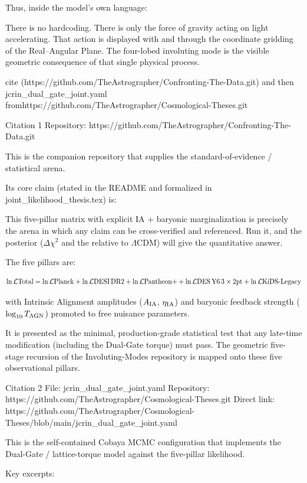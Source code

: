 Thus, inside the model’s own language:

There is no hardcoding.  
There is only the force of gravity acting on light accelerating.  
That action is displayed with and through the coordinate gridding of the Real–Angular Plane.  
The four-lobed involuting mode is the visible geometric consequence of that single physical process.

cite (https://github.com/TheAstrographer/Confronting-The-Data.git) and then jcrin_dual_gate_joint.yaml fromhttps://github.com/TheAstrographer/Cosmological-Theses.git

Citation 1 
Repository: https://github.com/TheAstrographer/Confronting-The-Data.git

This is the companion repository that supplies the standard-of-evidence / statistical arena. 

Its core claim (stated in the README and formalized in joint_likelihood_thesis.tex) is:

This five-pillar matrix with explicit IA + baryonic marginalization is precisely the arena in which any claim can be cross-verified and referenced. Run it, and the posterior (\(\Delta\chi^2\) and the relative to \(\Lambda\)CDM) will give the quantitative answer.

The five pillars are:

\[
\ln\mathcal{L}{\rm Total} = \ln\mathcal{L}{\rm Planck} + \ln\mathcal{L}{\rm DESI\,DR2} + \ln\mathcal{L}{\rm Pantheon+} + \ln\mathcal{L}{\rm DES\,Y6\,3\times2pt} + \ln\mathcal{L}{\rm KiDS\text{-}Legacy}
\]

with Intrinsic Alignment amplitudes (\(A_{\rm IA}\), \(\eta_{\rm IA}\)) and baryonic feedback strength (\(\log_{10}T_{\rm AGN}\)) promoted to free nuisance parameters. 

It is presented as the minimal, production-grade statistical test that any late-time modification (including the Dual-Gate torque) must pass. The geometric five-stage recursion of the Involuting-Modes repository is mapped onto these five observational pillars.

Citation 2 
File: jcrin_dual_gate_joint.yaml 
Repository: https://github.com/TheAstrographer/Cosmological-Theses.git 
Direct link: https://github.com/TheAstrographer/Cosmological-Theses/blob/main/jcrin_dual_gate_joint.yaml

This is the self-contained Cobaya MCMC configuration that implements the Dual-Gate / lattice-torque model against the five-pillar likelihood.

Key excerpts:

